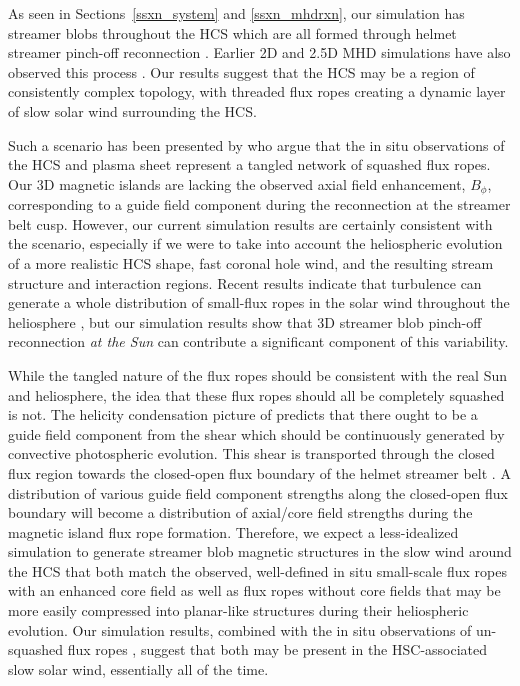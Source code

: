 \documentclass[preprint]{aastex62}
\begin{document}
As seen in Sections~\ref{ssxn_system} and \ref{ssxn_mhdrxn}, our
simulation has streamer blobs throughout the HCS which are all
formed through helmet streamer pinch-off reconnection \citep{Sheeley1997,
WangYM2000}. 
%
Earlier 2D and 2.5D MHD simulations have also observed
this process 
\citep[e.g.][]{Einaudi1999, Einaudi2001, Endeve2003, Endeve2004, Rappazzo2005, Lapenta2008blob, Allred2015}. 
%
Our results suggest that the HCS may be a region
of consistently complex topology, with threaded flux ropes creating
a dynamic layer of slow solar wind surrounding the HCS. 

Such a scenario has been presented by \citet{Crooker1996hps,
Crooker2004} who argue that the in situ observations of the HCS and 
plasma sheet represent a tangled network of squashed flux ropes.
Our 3D magnetic islands are lacking the observed axial field
enhancement, $B_\phi$, corresponding
to a guide field component during the reconnection at the streamer
belt cusp. However, our current simulation results are certainly consistent 
with the \citet{Crooker1996hps} scenario, especially if we were to take 
into account the heliospheric evolution of a more realistic HCS shape, 
fast coronal hole wind, and the resulting stream structure and interaction 
regions. Recent results indicate that turbulence can generate a whole distribution of small-flux ropes in the solar wind throughout the heliosphere \citep[e.g][]{Zheng2018}, but our simulation results show that 3D streamer blob pinch-off reconnection \emph{at the Sun} can contribute a significant component of this variability.

While the tangled nature of the flux ropes should be
consistent with the real Sun and heliosphere, the idea that these flux ropes
should all be completely squashed is not. The helicity condensation
picture of \citet{Antiochos2013} predicts that there ought to be a
guide field component from the shear which should be continuously
generated by convective photospheric evolution. This shear is transported
through the closed flux region towards the closed-open flux boundary
of the helmet streamer belt \citep[see also][]{Knizhnik2015,Knizhnik2017}.
A distribution of various guide field component strengths along the
closed-open flux boundary will become a distribution of axial/core
field strengths during the magnetic island flux rope formation.
Therefore, we expect a less-idealized simulation to generate streamer
blob magnetic structures in the slow wind around the HCS that both match the observed,
well-defined in situ small-scale flux ropes with an enhanced core
field as well as flux ropes without core fields that may be more
easily compressed into planar-like structures during their heliospheric
evolution. Our simulation results, combined with the in situ observations 
of un-squashed flux ropes \citep[as argued by][]{Moldwin2000}, suggest 
that both may be present in the HSC-associated slow solar wind, essentially all of the time.
\end{document}
